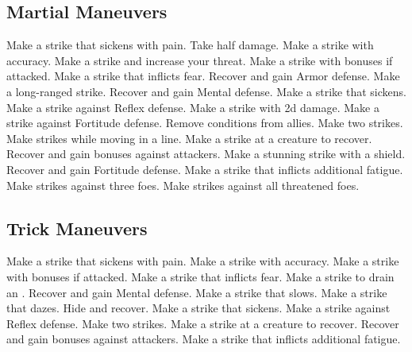 \subsection{Martial Maneuvers}\label{Martial Maneuvers}
\begin{spelllist}
 Make a strike that sickens with pain.
 Take half damage.
 Make a strike with  accuracy.
 Make a strike and increase your threat.
 Make a strike with bonuses if attacked.
 Make a strike that inflicts fear.
 Recover and gain  Armor defense.
 Make a long-ranged strike.
 Recover and gain  Mental defense.
 Make a strike that sickens.
 Make a strike against Reflex defense.
 Make a strike with \plus2d damage.
 Make a strike against Fortitude defense.
 Remove conditions from allies.
 Make two strikes.
 Make strikes while moving in a line.
 Make a strike at a creature to recover.
 Recover and gain bonuses against attackers.
 Make a stunning strike with a shield.
 Recover and gain  Fortitude defense.
 Make a strike that inflicts additional fatigue.
 Make strikes against three foes.
 Make strikes against all threatened foes.
\end{spelllist}



\small
\subsection{Trick Maneuvers}\label{Trick Maneuvers}
\begin{spelllist}
 Make a strike that sickens with pain.
 Make a strike with  accuracy.
 Make a strike with bonuses if attacked.
 Make a strike that inflicts fear.
 Make a strike to drain an .
 Recover and gain  Mental defense.
 Make a strike that slows.
 Make a strike that dazes.
 Hide and recover.
 Make a strike that sickens.
 Make a strike against Reflex defense.
 Make two strikes.
 Make a strike at a creature to recover.
 Recover and gain bonuses against attackers.
 Make a strike that inflicts additional fatigue.
\end{spelllist}



